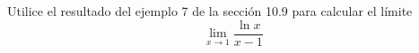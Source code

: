 \item Utilice el resultado del ejemplo 7 de la sección 10.9 para calcular el límite
    \[ \lim_{x \to 1} \frac{\ln x}{x - 1} \]
